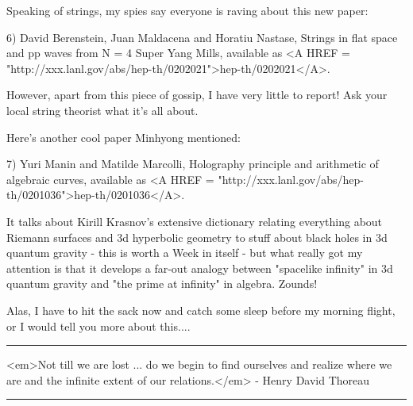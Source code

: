 Speaking of strings, my spies say everyone is raving about this
new paper:

6) David Berenstein, Juan Maldacena and Horatiu Nastase, Strings
in flat space and pp waves from N = 4 Super Yang Mills, available as
<A HREF = "http://xxx.lanl.gov/abs/hep-th/0202021">hep-th/0202021</A>.

However, apart from this piece of gossip, I have very little to
report!  Ask your local string theorist what it's all about.

Here's another cool paper Minhyong mentioned:

7) Yuri Manin and Matilde Marcolli, Holography principle and arithmetic 
of algebraic curves, available as <A HREF = "http://xxx.lanl.gov/abs/hep-th/0201036">hep-th/0201036</A>.

It talks about Kirill Krasnov's extensive dictionary relating 
everything about Riemann surfaces and 3d hyperbolic geometry
to stuff about black holes in 3d quantum gravity - this is worth 
a Week in itself - but what really got my attention is that it
develops a far-out analogy between "spacelike infinity" in 3d 
quantum gravity and "the prime at infinity" in algebra.  Zounds!

Alas, I have to hit the sack now and catch some sleep before my
morning flight, or I would tell you more about this....



 \par\noindent\rule{\textwidth}{0.4pt}
<em>Not till we are lost ... do we begin to find ourselves
and realize where we are and the infinite extent of our
relations.</em> - Henry David Thoreau
\par\noindent\rule{\textwidth}{0.4pt}

